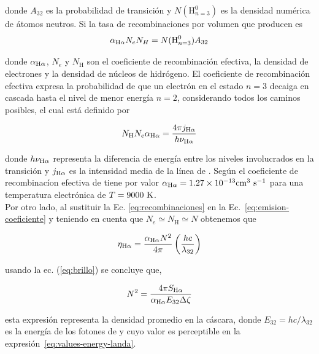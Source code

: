donde \(A_{32}\) es la probabilidad de transición y \(N(\text{H}^0_{n=3})\) es la densidad numérica de átomos neutros. Si la tasa de recombinaciones por volumen que producen \ha{} es 
\begin{equation}
  \label{eq:recombinaciones}
  \alpha_{\mathrm{H}\alpha} N_{e}N_{H}=N(\text{H}^0_{n=3})A_{32}
\end{equation}

donde  \(\alpha_{\mathrm{H}\alpha}\), \(N_{e}\) y \(N_{\text{H}}\)  son el coeficiente de recombinación efectiva, la densidad de electrones y la densidad de núcleos de hidrógeno. El coeficiente de recombinación efectiva  expresa la probabilidad de que un electrón en el estado \(n=3\) decaiga en cascada hasta el nivel de menor energía \(n=2\), considerando todos los caminos posibles, el cual está definido por 

\begin{equation*}
  \label{eq:coef}
  N_{\text{H}}N_{e}\alpha_{\mathrm{H}\alpha} = \frac{4\pi j_{\mathrm{H}\alpha}}{h\nu_{\mathrm{H}\alpha}}
\end{equation*}

donde \(h\nu_{\mathrm{H}\alpha}\) representa la diferencia de energía entre los niveles involucrados en la transición y \(j_{\mathrm{H}\alpha}\) es la intensidad media de la línea de \ha{}. Según \citet{Osterbrock:2006} el coeficiente de recombinacíon efectiva de \ha{} tiene por valor  \(\alpha_{\mathrm{H}\alpha}=1.27\times 10^{-13}\mathrm{cm}^{3}~\text{s}^{-1} \) para una temperatura electrónica de \(T=9000~\mathrm{K}\).\\


Por otro lado, al sustituir la Ec. \ref{eq:recombinaciones} en la Ec.~\ref{eq:emision-coeficiente} y teniendo en cuenta que \(N_{e}\simeq N_{\text{H}} \simeq N\) obtenemos que

\begin{equation}
 \eta_{\mathrm{H}\alpha} =  \frac{\alpha_{\mathrm{H}\alpha}N^{2}}{4\pi} \left(\frac{hc}{\lambda_{32}}\right)  
\end{equation}

 usando la ec. (\ref{eq:brillo}) se concluye que,

\begin{equation}
  \label{eq:densidad}
  N^{2}=\frac{4 \pi S_{\mathrm{H}\alpha}}{\alpha_{\mathrm{H}\alpha} E_{32} \Delta \zeta}
\end{equation}

\noindent esta expresión representa la densidad promedio en la cáscara, donde \( E_{32} = hc/\lambda_{32}\) es la energía de los fotones de \ha{} y cuyo valor es perceptible en la expresión~\ref{eq:values-energy-landa}. 


